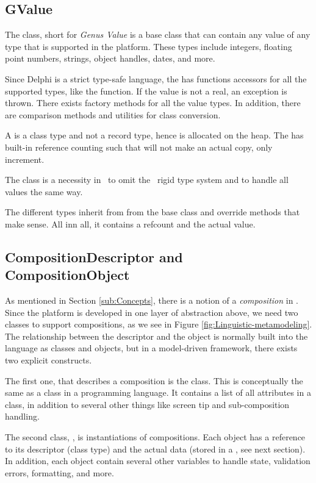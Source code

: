 \subsection{GValue}
\label{sub:GValue}
The  class, short for \textit{Genus Value} is a base class that can contain any value of any type that is supported in the platform. These types include integers, floating point numbers, strings, object handles, dates, and more. 

Since Delphi is a strict type-safe language, the  has functions accessors for all the supported types, like the  function. If the value is not a real, an exception is thrown. There exists factory methods for all the value types. In addition, there are comparison methods and utilities for class conversion.

A  is a class type and not a record type, hence is allocated on the heap. The  has built-in reference counting such that  will not make an actual copy, only increment.

The  class is a necessity in \gap~to omit the \delphi~rigid type system and to handle all values the same way.

The different  types inherit from from the base class and override methods that make sense. All inn all, it contains a refcount and the actual value.


\subsection{CompositionDescriptor and CompositionObject}
\label{sub:CompositionDescriptor}
As mentioned in Section \ref{sub:Concepts}, there is a notion of a \textit{composition} in \gap. Since the platform is developed in one layer of abstraction above, we need two classes to support compositions, as we see in Figure \ref{fig:Linguistic-metamodeling}. The relationship between the descriptor and the object is normally built into the language as classes and objects, but in a model-driven framework, there exists two explicit constructs.

The first one, that describes a composition is the  class. This is conceptually the same as a class in a programming language. It contains a list of all attributes in a class, in addition to several other things like screen tip and sub-composition handling.

The second class, , is instantiations of compositions. Each object has a reference to its descriptor (class type) and the actual data (stored in a , see next section). In addition, each object contain several other variables to handle state, validation errors, formatting, and more.


